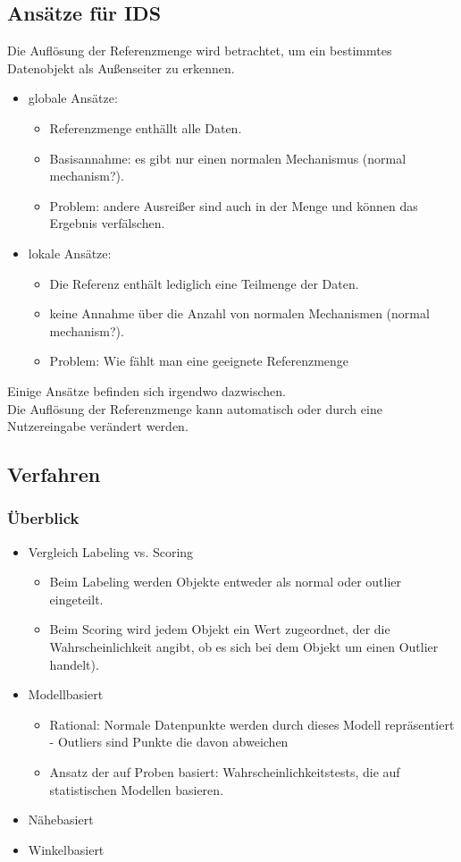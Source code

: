 \documentclass{article} %
\begin{document}
\subsection{Ansätze für IDS}
Die Auflösung der Referenzmenge wird betrachtet, um ein bestimmtes Datenobjekt als Außenseiter zu erkennen.
\begin{itemize}
    \item globale Ansätze:    
    \begin{itemize}
        \item Referenzmenge enthällt alle Daten.
        \item Basisannahme: es gibt nur einen normalen Mechanismus (normal mechanism?).
        \item Problem: andere Ausreißer sind auch in der Menge und können das Ergebnis verfälschen.
    \end{itemize}
    \item lokale Ansätze:
    
    \begin{itemize}
        \item Die Referenz enthält lediglich eine Teilmenge der Daten.
        \item keine Annahme über die Anzahl von normalen Mechanismen (normal mechanism?).
        \item Problem: Wie fählt man eine geeignete Referenzmenge
    \end{itemize}
\end{itemize}
Einige Ansätze befinden sich irgendwo dazwischen.\\
Die Auflösung der Referenzmenge kann automatisch oder durch eine Nutzereingabe verändert werden.
\subsection{Verfahren}
\subsubsection{Überblick}
	\begin{itemize}
	\item Vergleich Labeling vs. Scoring
		\begin{itemize}
		\item Beim Labeling werden Objekte entweder als normal oder outlier eingeteilt.
		\item Beim Scoring wird jedem Objekt ein Wert zugeordnet, der die Wahrscheinlichkeit angibt, ob es sich bei dem Objekt um einen Outlier handelt).
		\end{itemize}
	\item Modellbasiert
		\begin{itemize}
		\item Rational: Normale Datenpunkte werden durch dieses Modell repräsentiert - Outliers sind Punkte die davon abweichen
		\item Ansatz der auf Proben basiert: Wahrscheinlichkeitstests, die auf statistischen Modellen basieren.
		\end{itemize}
	\item Nähebasiert
	\item Winkelbasiert
	\end{itemize}
\end{document}
